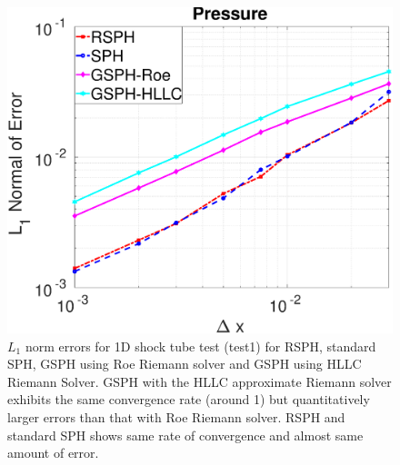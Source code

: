 \begin{figure}
\begin{minipage}{.332 \textwidth}
    \end{minipage}%
    \begin{minipage}{.332\textwidth}
        \centering
        \includegraphics[width=0.99 \textwidth]{Chapter-4/Figures/Accuracy-pre}
    \end{minipage}%
    \caption{ $L_1$ norm errors for 1D shock tube test (test1) for RSPH, standard SPH, GSPH using Roe Riemann solver and GSPH using HLLC Riemann Solver.  GSPH with the HLLC approximate Riemann solver exhibits the same convergence rate (around 1) but quantitatively larger errors than that with Roe Riemann solver. RSPH and standard SPH shows same rate of convergence and almost same amount of error.}
    \label{fig:Accuracy-test1}
\end{figure}
 
